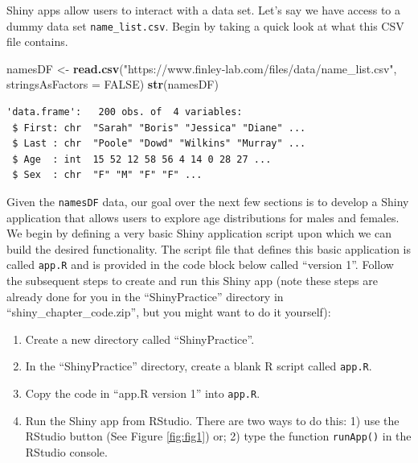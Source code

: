 \documentclass[
]{krantz}
\makeatletter
\newenvironment{Shaded}{\begin{snugshade}}{\end{snugshade}}
\newcommand{\DataTypeTok}[1]{\textcolor[rgb]{0.27,0.27,0.27}{#1}}
\newcommand{\KeywordTok}[1]{\textcolor[rgb]{0.27,0.27,0.27}{\textbf{#1}}}
\newcommand{\NormalTok}[1]{#1}
\newcommand{\OtherTok}[1]{\textcolor[rgb]{0.37,0.37,0.37}{#1}}
\newcommand{\StringTok}[1]{\textcolor[rgb]{0.5,0.5,0.5}{#1}}
\providecommand{\tightlist}{%
  \setlength{\itemsep}{0pt}\setlength{\parskip}{0pt}}
\newenvironment{kframe}{%
\medskip{}
\setlength{\fboxsep}{.8em}
 \def\at@end@of@kframe{}%
 \ifinner\ifhmode%
  \def\at@end@of@kframe{\end{minipage}}%
  \begin{minipage}{\columnwidth}%
 \fi\fi%
 \def\FrameCommand##1{\hskip\@totalleftmargin \hskip-\fboxsep
 \colorbox{shadecolor}{##1}\hskip-\fboxsep
     \hskip-\linewidth \hskip-\@totalleftmargin \hskip\columnwidth}%
 \MakeFramed {\advance\hsize-\width
   \@totalleftmargin\z@ \linewidth\hsize
   \@setminipage}}%
 {\par\unskip\endMakeFramed%
 \at@end@of@kframe}
\renewenvironment{Shaded}{\begin{kframe}}{\end{kframe}}
\makeatother
\begin{document}
Shiny apps allow users to interact with a data set. Let's say we have access to a dummy data set \texttt{name\_list.csv}. Begin by taking a quick look at what this CSV file contains.

\begin{Shaded}
\begin{Highlighting}[]
\NormalTok{namesDF \textless{}{-}}\StringTok{ }\KeywordTok{read.csv}\NormalTok{(}\StringTok{"https://www.finley{-}lab.com/files/data/name\_list.csv"}\NormalTok{, }
                    \DataTypeTok{stringsAsFactors =} \OtherTok{FALSE}\NormalTok{)}
\KeywordTok{str}\NormalTok{(namesDF)}
\end{Highlighting}
\end{Shaded}

\begin{verbatim}
'data.frame':   200 obs. of  4 variables:
 $ First: chr  "Sarah" "Boris" "Jessica" "Diane" ...
 $ Last : chr  "Poole" "Dowd" "Wilkins" "Murray" ...
 $ Age  : int  15 52 12 58 56 4 14 0 28 27 ...
 $ Sex  : chr  "F" "M" "F" "F" ...
\end{verbatim}

Given the \texttt{namesDF} data, our goal over the next few sections is to develop a Shiny application that allows users to explore age distributions for males and females. We begin by defining a very basic Shiny application script upon which we can build the desired functionality. The script file that defines this basic application is called \texttt{app.R} and is provided in the code block below called ``version 1''. Follow the subsequent steps to create and run this Shiny app (note these steps are already done for you in the ``ShinyPractice'' directory in ``shiny\_chapter\_code.zip'', but you might want to do it yourself):

\begin{enumerate}
\def\labelenumi{\arabic{enumi}.}
\tightlist
\item
  Create a new directory called ``ShinyPractice''.
\item
  In the ``ShinyPractice'' directory, create a blank R script called \texttt{app.R}.
\item
  Copy the code in ``app.R version 1'' into \texttt{app.R}.
\item
  Run the Shiny app from RStudio. There are two ways to do this: 1) use the RStudio button (See Figure \ref{fig:fig1}) or; 2) type the function \texttt{runApp()} in the RStudio console.
\end{enumerate}
\end{document}
